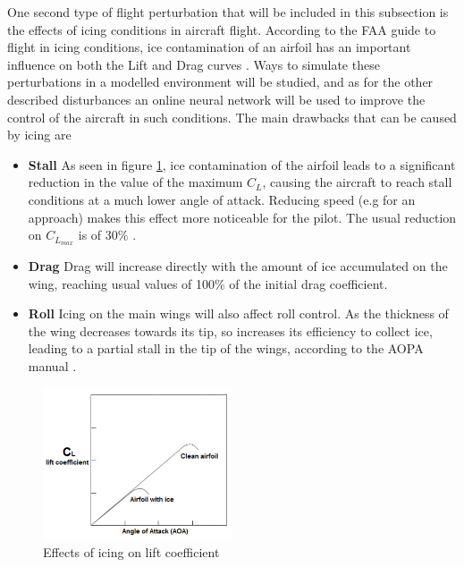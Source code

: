 One second type of flight perturbation that will be included in this subsection is the effects of icing conditions in aircraft flight. According to the FAA guide to flight in icing conditions, ice contamination of an airfoil has an important influence on both the Lift and Drag curves \cite{icing_cond}. Ways to simulate these perturbations in a modelled environment will be studied, and as for the other described disturbances an online neural network will be used to improve the control of the aircraft in such conditions. The main drawbacks that can be caused by icing are

\begin{itemize}
\item \textbf{Stall }As seen in figure \ref{fig:icing_lift}, ice contamination of the airfoil leads to a significant reduction in the value of the maximum $C_L$, causing the aircraft to reach stall conditions at a much lower angle of attack. Reducing speed (e.g for an approach) makes this effect more noticeable for the pilot. The usual reduction on $C_{L_{max}}$ is of 30\% \cite{icing_cond}.

\item \textbf{Drag }Drag will increase directly with the amount of ice accumulated on the wing, reaching usual values of 100\% of the initial drag coefficient.

\item \textbf{Roll }Icing on the main wings will also affect roll control. As the thickness of the wing decreases towards its tip, so increases its efficiency to collect ice, leading to a partial stall in the tip of the wings, according to the AOPA manual \cite{icing_aopa}.
\end{itemize}
\begin{figure}[H]
\centering
\includegraphics[width=0.5\textwidth]{Figures/Results/icing_lift.PNG}
\caption[Effects of icing on lift coefficient]{Effects of icing on lift coefficient \cite{icing_cond}}
\label{fig:icing_lift}
\end{figure}
